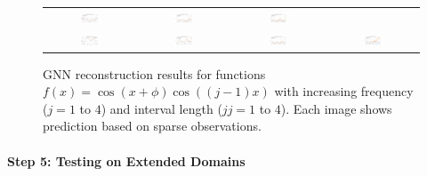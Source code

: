 \begin{figure}[ht]
\begin{tabular}{cccc}
    \includegraphics[width=0.23\textwidth]{images/gnn_obs_naive_j3_jj2_0.png} &
    \includegraphics[width=0.23\textwidth]{images/gnn_obs_naive_j3_jj3_0.png} &
    \includegraphics[width=0.23\textwidth]{images/gnn_obs_naive_j3_jj4_0.png} \\
    \includegraphics[width=0.23\textwidth]{images/gnn_obs_naive_j4_jj1_0.png} &
    \includegraphics[width=0.23\textwidth]{images/gnn_obs_naive_j4_jj2_0.png} &
    \includegraphics[width=0.23\textwidth]{images/gnn_obs_naive_j4_jj3_0.png} &
    \includegraphics[width=0.23\textwidth]{images/gnn_obs_naive_j4_jj4_0.png} \\
  \end{tabular}
  \caption{GNN reconstruction results for functions $f(x) = \cos(x + \phi)\cos((j-1)x)$ with increasing frequency ($j = 1$ to $4$) and interval length ($jj = 1$ to $4$). Each image shows prediction based on sparse observations.}
  \label{fig:gnn_jj_generalization_full}
\end{figure}


\paragraph{Step 5: Testing on Extended Domains}

